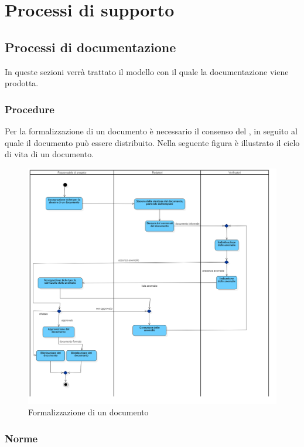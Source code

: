 \documentclass[a4paper, titlepage]{article}
\begin{document}
\newpage

\section{Processi di supporto}

\subsection{Processi di documentazione}
In queste sezioni verrà trattato il modello con il quale la documentazione viene prodotta.

\subsubsection{Procedure}

Per la formalizzazione di un documento è necessario il consenso del , in seguito al quale il documento può essere distribuito.
Nella seguente figura è illustrato il ciclo di vita di un documento.
\begin{figure}[!h]
	\includegraphics[width=\textwidth]{Img/docflow.png}
	\caption{Formalizzazione di un documento}
	\label{fig:documento}
\end{figure}
\newpage

\subsubsection{Norme}
\end{document}
